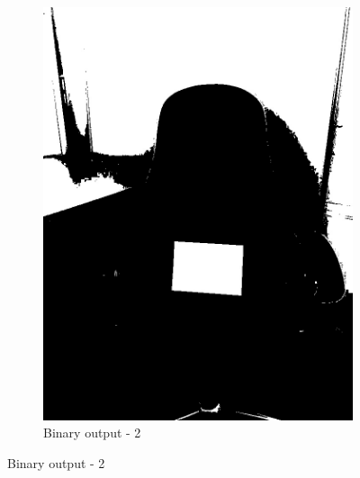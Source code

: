\documentclass[paper=a4, fontsize=10pt]{scrartcl} %
\numberwithin{equation}{section} %
\numberwithin{figure}{section} %
\begin{document}
\begin{figure}
\begin{subfigure}[b]{0.35\textwidth}
		\includegraphics[width=\textwidth]{binary_02}
		\caption{Binary output - 2}
		\label{fig:binary_output_02}
	\end{subfigure}


\end{figure}
\end{document}
